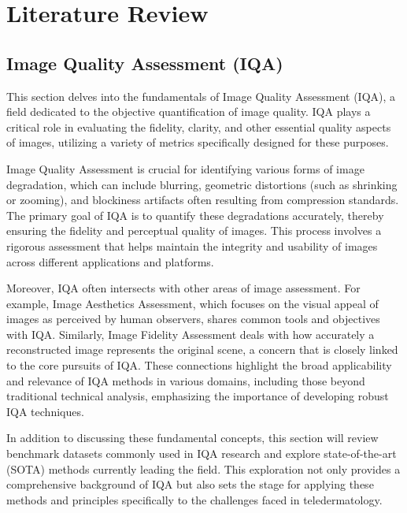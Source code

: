 \chapter{Literature Review}
\label{ch:LiteratureReview}

\section{Image Quality Assessment (IQA)}
\label{sec:OverviewTeledermatology}
This section delves into the fundamentals of Image Quality Assessment (IQA), a field dedicated to the objective quantification of image quality. IQA plays a critical role in evaluating the fidelity, clarity, and other essential quality aspects of images, utilizing a variety of metrics specifically designed for these purposes. \par
\vspace{\baselineskip}
Image Quality Assessment is crucial for identifying various forms of image degradation, which can include blurring, geometric distortions (such as shrinking or zooming), and blockiness artifacts often resulting from compression standards. The primary goal of IQA is to quantify these degradations accurately, thereby ensuring the fidelity and perceptual quality of images. This process involves a rigorous assessment that helps maintain the integrity and usability of images across different applications and platforms.\par
\vspace{\baselineskip}
Moreover, IQA often intersects with other areas of image assessment. For example, Image Aesthetics Assessment, which focuses on the visual appeal of images as perceived by human observers, shares common tools and objectives with IQA. Similarly, Image Fidelity Assessment deals with how accurately a reconstructed image represents the original scene, a concern that is closely linked to the core pursuits of IQA. These connections highlight the broad applicability and relevance of IQA methods in various domains, including those beyond traditional technical analysis, emphasizing the importance of developing robust IQA techniques.\par
\vspace{\baselineskip}
In addition to discussing these fundamental concepts, this section will review benchmark datasets commonly used in IQA research and explore state-of-the-art (SOTA) methods currently leading the field. This exploration not only provides a comprehensive background of IQA but also sets the stage for applying these methods and principles specifically to the challenges faced in teledermatology.\par

